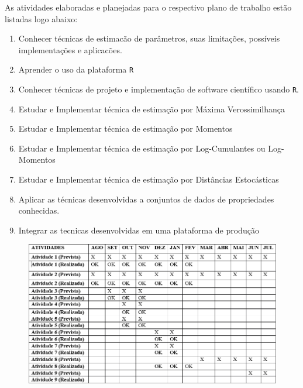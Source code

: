 \documentclass[12pt]{article}
\begin{document}
As atividades elaboradas e planejadas para o respectivo plano de trabalho estão listadas logo abaixo:

\begin{enumerate} 
  \item  Conhecer técnicas de estimacão de parâmetros, suas limitações, possíveis implementações e aplicacões.
  \item  Aprender o uso da plataforma \texttt{R}
  \item  Conhecer técnicas de projeto e implementação de software científico usando \texttt{R}.
  \item  Estudar e Implementar técnica de estimação por Máxima Verossimilhança
  \item  Estudar e Implementar técnica de estimação por Momentos
  \item  Estudar e Implementar técnica de estimação por Log-Cumulantes ou Log-Momentos
  \item  Estudar e Implementar técnica de estimação por Distâncias Estocásticas
  \item  Aplicar as técnicas desenvolvidas a conjuntos de dados de propriedades conhecidas. 
  \item  Integrar as tecnicas desenvolvidas em uma plataforma de produção
\end{enumerate}

\begin{figure}[!hbt]
	\begin{center}
    \vspace{-0.5cm}
		\includegraphics[width=0.9\columnwidth]{tabela-cronograma.png}
	\end{center}
\end{figure}
\end{document}
